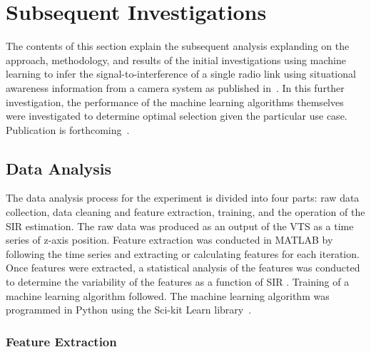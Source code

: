 \section{Subsequent Investigations}

The contents of this section explain the subsequent analysis explanding on the approach, methodology, and results of the initial investigations using machine learning to infer the signal-to-interference of a single radio link using situational awareness information from a camera system as published in~\cite{CandellISIE2019.Conf}.  In this further investigation, the performance of the machine learning algorithms themselves were investigated to determine optimal selection given the particular use case. Publication is forthcoming~\cite{Candell2020.Jrnl.Access}.


\subsection{Data Analysis}\label{ftml-jrnl:sec:dataanalysis}


The data analysis process for the experiment
is divided into four parts: raw data collection, data cleaning and feature extraction, training, and the operation of the SIR estimation. The raw data was produced as an output of the VTS as a time series of z-axis position. Feature extraction was conducted in MATLAB by following the time series and extracting or calculating features for each iteration.  Once features were extracted, a statistical analysis of the features was conducted to determine the variability of the features as a function of SIR \cite{Candell_ISIT_2019}. Training of a machine learning algorithm followed. The machine learning algorithm was programmed in Python using the Sci-kit Learn library~\cite{SCIKITLEARN}.

\subsubsection{Feature Extraction}\label{ftml-jrnl:sec:data:feats}

